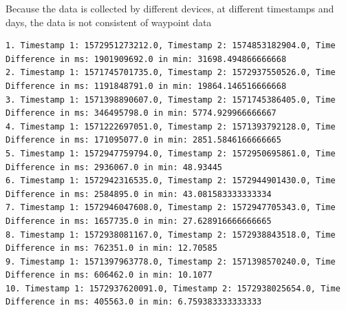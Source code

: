 Because the data is collected by different devices, at different timestamps and days, the data is not consistent of waypoint data 

\begin{lstlisting}
1. Timestamp 1: 1572951273212.0, Timestamp 2: 1574853182904.0, Time Difference in ms: 1901909692.0 in min: 31698.494866666668 
2. Timestamp 1: 1571745701735.0, Timestamp 2: 1572937550526.0, Time Difference in ms: 1191848791.0 in min: 19864.146516666668 
3. Timestamp 1: 1571398890607.0, Timestamp 2: 1571745386405.0, Time Difference in ms: 346495798.0 in min: 5774.929966666667 
4. Timestamp 1: 1571222697051.0, Timestamp 2: 1571393792128.0, Time Difference in ms: 171095077.0 in min: 2851.5846166666665 
5. Timestamp 1: 1572947759794.0, Timestamp 2: 1572950695861.0, Time Difference in ms: 2936067.0 in min: 48.93445 
6. Timestamp 1: 1572942316535.0, Timestamp 2: 1572944901430.0, Time Difference in ms: 2584895.0 in min: 43.081583333333334 
7. Timestamp 1: 1572946047608.0, Timestamp 2: 1572947705343.0, Time Difference in ms: 1657735.0 in min: 27.628916666666665 
8. Timestamp 1: 1572938081167.0, Timestamp 2: 1572938843518.0, Time Difference in ms: 762351.0 in min: 12.70585 
9. Timestamp 1: 1571397963778.0, Timestamp 2: 1571398570240.0, Time Difference in ms: 606462.0 in min: 10.1077 
10. Timestamp 1: 1572937620091.0, Timestamp 2: 1572938025654.0, Time Difference in ms: 405563.0 in min: 6.759383333333333 
\end{lstlisting}


